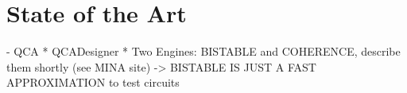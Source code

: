\chapter{State of the Art}\label{sec:state_of_art}
- QCA 
	* QCADesigner
	* Two Engines: BISTABLE and COHERENCE, describe them shortly (see MINA site)
	-> BISTABLE IS JUST A FAST APPROXIMATION to test circuits
